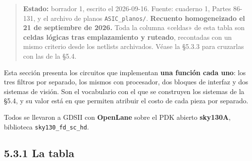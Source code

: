 \begin{quote}
\textbf{Estado:} borrador 1, escrito el 2026-09-16. Fuente: cuaderno 1,
Partes 86-131, y el archivo de planos \texttt{ASIC\_planos/}.
\textbf{Recuento homogeneizado el 21 de septiembre de 2026.} Toda la
columna «celdas» de esta tabla son \textbf{celdas lógicas tras
emplazamiento y ruteado}, recontadas con un mismo criterio desde los
netlists archivados. Véase la §5.3.3 para cruzarlas con las de la §5.4.
\end{quote}

Esta sección presenta los circuitos que implementan \textbf{una función
cada uno}: los tres filtros por separado, los mismos con procesador, dos
bloques de interfaz y dos sistemas de visión. Son el vocabulario con el
que se construyen los sistemas de la §5.4, y su valor está en que
permiten atribuir el costo de cada pieza por separado.

Todos se llevaron a GDSII con \textbf{OpenLane} sobre el PDK abierto
\textbf{sky130A}, biblioteca \texttt{sky130\_fd\_sc\_hd}.

\subsection{5.3.1 La tabla}\label{la-tabla}

